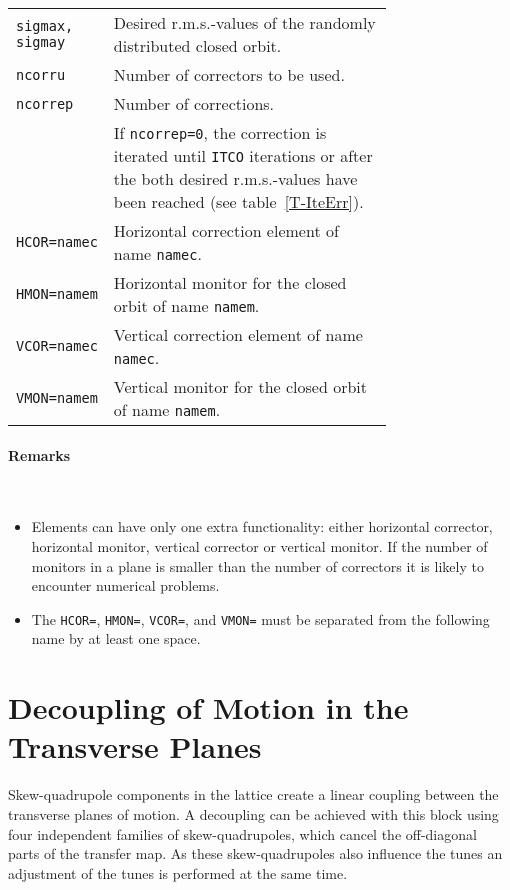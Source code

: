 \bigskip
\begin{longtabu}{@{}lp{0.75\linewidth}}
    \texttt{sigmax, sigmay} & Desired r.m.s.-values of the randomly distributed closed orbit. \\
    \texttt{ncorru}         & Number of correctors to be used. \\
    \texttt{ncorrep}        & Number of corrections. \\
                            & If \texttt{ncorrep=0}, the correction is iterated until \texttt{ITCO} iterations or after the both desired r.m.s.-values have been reached (see table~\ref{T-IteErr}). \\
    \texttt{HCOR=namec}     & Horizontal correction element of name \texttt{namec}. \\
    \texttt{HMON=namem}     & Horizontal monitor for the closed orbit of name \texttt{namem}. \\
    \texttt{VCOR=namec}     & Vertical correction element of name \texttt{namec}. \\
    \texttt{VMON=namem}     & Vertical monitor for the closed orbit of name \texttt{namem}.
\end{longtabu}

\paragraph{Remarks}~

\begin{itemize}
    \item Elements can have only one extra functionality: either horizontal corrector, horizontal monitor, vertical corrector or   vertical monitor. If the number of monitors in a plane is smaller than the number of correctors it is likely to encounter numerical problems.
    \item The \texttt{HCOR=}, \texttt{HMON=}, \texttt{VCOR=}, and \texttt{VMON=} must be separated from the following name by at least one space.
\end{itemize}

\section{Decoupling of Motion in the Transverse Planes} \label{LinDec}

Skew-quadrupole components in the lattice create a linear coupling between the transverse planes of motion.
A decoupling can be achieved with this block using four independent families of skew-quadrupoles, which cancel the off-diagonal parts of the transfer map.
As these skew-quadrupoles also influence the tunes an adjustment of the tunes is performed at the same time.


